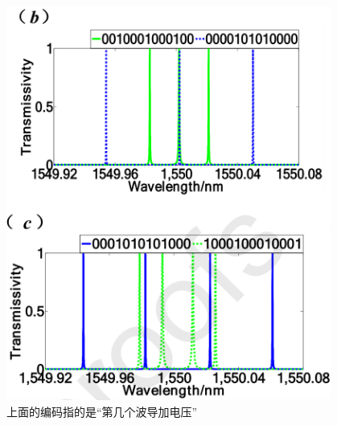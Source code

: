 \begin{frame}[c]
\begin{columns}
\begin{column}{0.5\textwidth}
        \end{column}
        \begin{column}{0.5\textwidth}
            \begin{figure}[H] %
                \centering %
                \includegraphics[width=.9\textwidth]{figures/Design of programmable multi-wavelength tunable filter on lithium niobate_4.png} %
                \caption{上面的编码指的是“第几个波导加电压”}
            \end{figure}
        \end{column}
    \end{columns}

\end{frame}